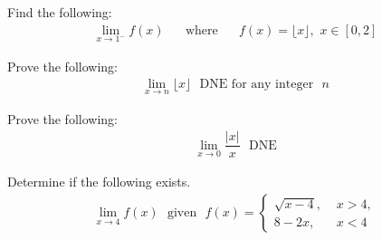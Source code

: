 \begin{exercise}
Find the following: 
\begin{align*}
    \lim_{x \longrightarrow 1^{-}} f(x) \hspace{20pt} \text{where} \hspace{20pt} f(x) = \lfloor x \rfloor,  \hspace{4pt} x \in [0, 2]
\end{align*}
\end{exercise}

\begin{exercise}
Prove the following:
\begin{align*}
    \lim_{x \longrightarrow n} \lfloor x \rfloor \hspace{8pt} \text{DNE for any integer} \hspace{8pt} n 
\end{align*}
\end{exercise}

\begin{exercise}
Prove the following:
\begin{align*}
    \lim_{x \longrightarrow 0} \dfrac{\lvert x \rvert}{x} \hspace{8pt} \text{DNE}
\end{align*}
\end{exercise}

\begin{exercise}
Determine if the following exists.
\begin{align*}
    \lim_{x \longrightarrow 4} f(x) \hspace{8pt} \text{given} \hspace{8pt} f(x) = 
    \begin{cases}
    \sqrt{x-4}, \hspace{4pt} &x > 4,\\[2ex]
    8-2x, \hspace{4pt} &x < 4
    \end{cases}
\end{align*}
\end{exercise}
